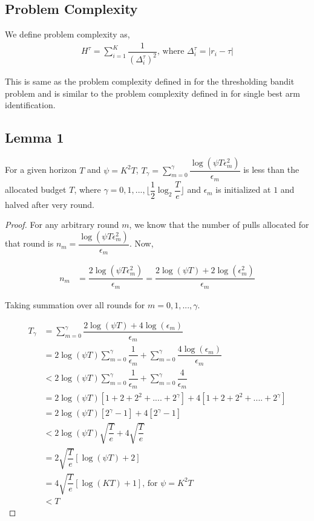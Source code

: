 

\subsection{Problem Complexity}

We define problem complexity as,
\begin{align*}
H^{\tau} = \sum_{i=1}^{K}\dfrac{1}{(\Delta_{i}^{\tau})^{2}} \text{, where } \Delta_{i}^{\tau}=|r_{i}-\tau|
\end{align*}

This is same as the problem complexity defined in \cite{locatelli2016optimal} for the thresholding bandit problem and is similar to the problem complexity defined in \cite{audibert2010best} for single best arm identification.

\subsection{Lemma 1} For a given horizon $T$ and $\psi=K^{2}T$, $T_{\gamma} = \sum_{m=0}^{\gamma}\dfrac{\log(\psi T \epsilon_{m}^{2})}{\epsilon_{m}}$ is less than the allocated budget $T$, where $\gamma=0,1,...,\big\lfloor \dfrac{1}{2}\log_{2} \dfrac{T}{e}\big\rfloor$ and $\epsilon_{m}$ is initialized at $1$ and halved after very round. 

\begin{proof}
For any arbitrary round $m$, we know that the number of pulls allocated for that round is 
$n_{m} = \dfrac{\log(\psi T \epsilon_{m}^{2})}{\epsilon_{m}}$. Now, 

\begin{align*}
n_{m} &= \dfrac{2\log(\psi T \epsilon_{m}^{2})}{\epsilon_{m}}
= \dfrac{2\log(\psi T) + 2\log(\epsilon_{m}^{2})}{\epsilon_{m}}
\end{align*}

Taking summation over all rounds for $m=0,1,...,\gamma$. 

\begin{align*}
T_{\gamma} &= \sum_{m=0}^{\gamma}\dfrac{2\log(\psi T) + 4\log(\epsilon_{m})}{\epsilon_{m}}\\
&= 2\log (\psi T)\sum_{m=0}^{\gamma}\dfrac{1}{\epsilon_{m}} + \sum_{m=0}^{\gamma}\dfrac{4\log (\epsilon_{m})}{\epsilon_{m}}\\
&< 2\log (\psi T)\sum_{m=0}^{\gamma}\dfrac{1}{\epsilon_{m}} + \sum_{m=0}^{\gamma}\dfrac{4}{\epsilon_{m}}\\
&= 2\log (\psi T)[1+2+2^{2}+....+2^{\gamma}] + 4[1+2+2^{2}+....+2^{\gamma}]\\
&= 2\log (\psi T)[2^{\gamma} - 1] + 4[2^{\gamma} - 1]\\
&< 2\log (\psi T)\sqrt{\dfrac{T}{e}} + 4\sqrt{\dfrac{T}{e}}\\
&= 2\sqrt{\dfrac{T}{e}}[\log (\psi T) + 2]\\
&= 4\sqrt{\dfrac{T}{e}}[\log (K T) + 1] \text{, for } \psi=K^{2}T\\
&< T
\end{align*}


\end{proof}


